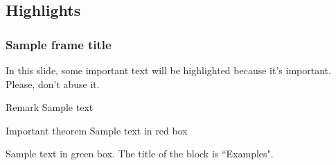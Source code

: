 \documentclass{beamer}
\begin{document}
\subsection{Highlights}

\begin{frame}
  \frametitle{Sample frame title}

  In this slide, some important text will be
  \alert{highlighted} because it's important.
  Please, don't abuse it.

  \begin{block}{Remark}
  Sample text
  \end{block}

  \begin{alertblock}{Important theorem}
  Sample text in red box
  \end{alertblock}

  \begin{examples}
  Sample text in green box. The title of the block is ``Examples".
  \end{examples}
\end{frame}
\end{document}
